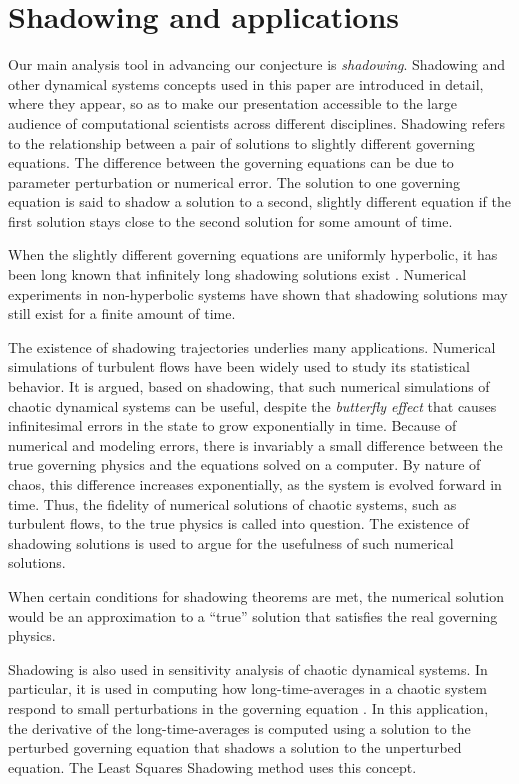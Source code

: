 \section{Shadowing and applications}
\label{sec:shadowingIntro}
Our main analysis tool in advancing our conjecture is {\em shadowing}. Shadowing and other dynamical systems concepts used in this paper are introduced in detail, where they appear, so as to make our presentation accessible to the large audience of computational scientists across different disciplines. Shadowing refers to the relationship between a pair of solutions to slightly different governing equations. The difference between the governing equations can be due to parameter perturbation or numerical error. The solution to one governing equation is said to shadow a solution to a second, slightly different equation if
the first solution stays close to the second solution for some amount of time.

When the slightly different governing equations are uniformly hyperbolic, it has been long known that infinitely 
long shadowing solutions exist \cite{anosov}\cite{bowen}.
Numerical experiments in non-hyperbolic systems have shown that shadowing
solutions may still exist \cite{grebogi}\cite{hammel} for a 
finite amount of time.

The existence of shadowing trajectories underlies many applications.
Numerical simulations of turbulent flows have been widely used to study its statistical behavior.
It is argued, based on shadowing, that such numerical simulations of chaotic dynamical systems can be
useful, despite the \emph{butterfly effect} that causes infinitesimal errors in the state to grow exponentially in time. Because of numerical and modeling errors, there is invariably a small difference between the true governing physics and the equations solved on a computer. By nature of chaos, this difference increases exponentially, as the system is evolved forward in time. Thus, the fidelity of numerical solutions of chaotic systems, such
as turbulent flows, to the true physics is called into question.  The existence of shadowing solutions
is used to argue for the usefulness of such numerical solutions.

When certain conditions for shadowing theorems are met, the numerical solution would be an
approximation to a ``true'' solution that satisfies the real governing physics.

Shadowing is also used in sensitivity analysis of chaotic dynamical systems.  In particular,
it is used in computing how long-time-averages in a chaotic system
respond to small perturbations in the governing equation \cite{qiqi-lss}\cite{angxiu-lss}\cite{lasagna}. In this application, the derivative
of the long-time-averages is computed using a solution to the perturbed governing equation
that shadows a solution to the unperturbed equation.  The Least Squares Shadowing \cite{qiqi-lss}\cite{angxiu-lss} method
uses this concept.

